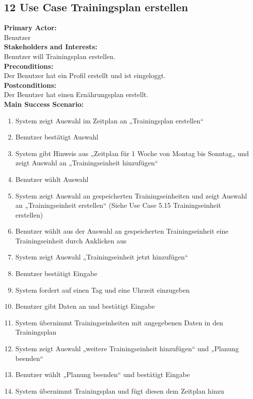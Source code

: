 \documentclass[12pt,a4paper,onecolumn]{article}
\begin{document}
\subsection{12 Use Case Trainingsplan erstellen}
\textbf{Primary Actor:}\\ Benutzer\\
\textbf{Stakeholders and Interests:}\\
Benutzer will \gls{Trainingsplan} erstellen.\\
\textbf{Preconditions:} \\ Der Benutzer hat ein Profil erstellt und ist eingeloggt.\\
\textbf{Postconditions:}\\Der Benutzer hat einen \gls{Ernährungsplan} erstellt.\\
\textbf{Main Success Scenario:}
\begin{enumerate}
    \item System zeigt Auswahl im \gls{Zeitplan} an „Trainingsplan erstellen“
    \item Benutzer bestätigt Auswahl
    \item System gibt Hinweis aus „Zeitplan für 1 Woche von Montag bis Sonntag„ und zeigt Auswahl an „\gls{Trainingseinheit} hinzufügen“
    \item Benutzer wählt Auswahl 
    \item System zeigt Auswahl an gespeicherten \gls{Trainingseinheit}en und zeigt Auswahl an „\gls{Trainingseinheit} erstellen“ (Siehe Use Case 5.15 \gls{Trainingseinheit} erstellen)
    \item Benutzer wählt aus der Auswahl an gespeicherten \gls{Trainingseinheit} eine \gls{Trainingseinheit} durch Anklicken aus 
    \item System zeigt Auswahl „\gls{Trainingseinheit} jetzt hinzufügen“
    \item Benutzer bestätigt Eingabe
    \item System fordert auf einen Tag und eine Uhrzeit einzugeben
    \item Benutzer gibt Daten an und bestätigt Eingabe
    \item System übernimmt \gls{Trainingseinheit}en mit angegebenen Daten in den \gls{Trainingsplan}
    \item System zeigt Auswahl „weitere \gls{Trainingseinheit} hinzufügen“ und „Planung beenden“
    \item Benutzer wählt „Planung beenden“ und bestätigt Eingabe
    \item System übernimmt \gls{Trainingsplan} und fügt diesen dem \gls{Zeitplan} hinzu
\end{enumerate}
\end{document}
